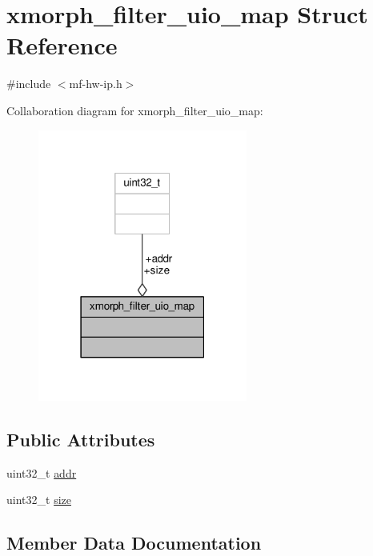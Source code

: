 \hypertarget{structxmorph__filter__uio__map}{}\section{xmorph\+\_\+filter\+\_\+uio\+\_\+map Struct Reference}
\label{structxmorph__filter__uio__map}


{\ttfamily \#include $<$mf-\/hw-\/ip.\+h$>$}



Collaboration diagram for xmorph\+\_\+filter\+\_\+uio\+\_\+map\+:
\nopagebreak
\begin{figure}[H]
\begin{center}
\leavevmode
\includegraphics[width=195pt]{structxmorph__filter__uio__map__coll__graph}
\end{center}
\end{figure}
\subsection*{Public Attributes}
\begin{DoxyCompactItemize}
\item 
uint32\+\_\+t \hyperlink{structxmorph__filter__uio__map_afc5d71f297427642921e2bdc1650db31}{addr}
\item 
uint32\+\_\+t \hyperlink{structxmorph__filter__uio__map_a5da76368d6196b966516005fdae05937}{size}
\end{DoxyCompactItemize}


\subsection{Member Data Documentation}
